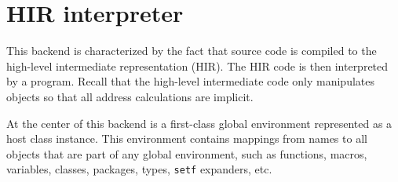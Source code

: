 \chapter{HIR interpreter}

This backend is characterized by the fact that source code is compiled
to the high-level intermediate representation (HIR).  The HIR code is
then interpreted by a \commonlisp{} program.  Recall that the
high-level intermediate code only manipulates \commonlisp{} objects so
that all address calculations are implicit.

At the center of this backend is a \sysname{} first-class global
environment represented as a host class instance.  This environment
contains mappings from names to all objects that are part of any
global environment, such as functions, macros, variables, classes,
packages, types, \texttt{setf} expanders, etc.
